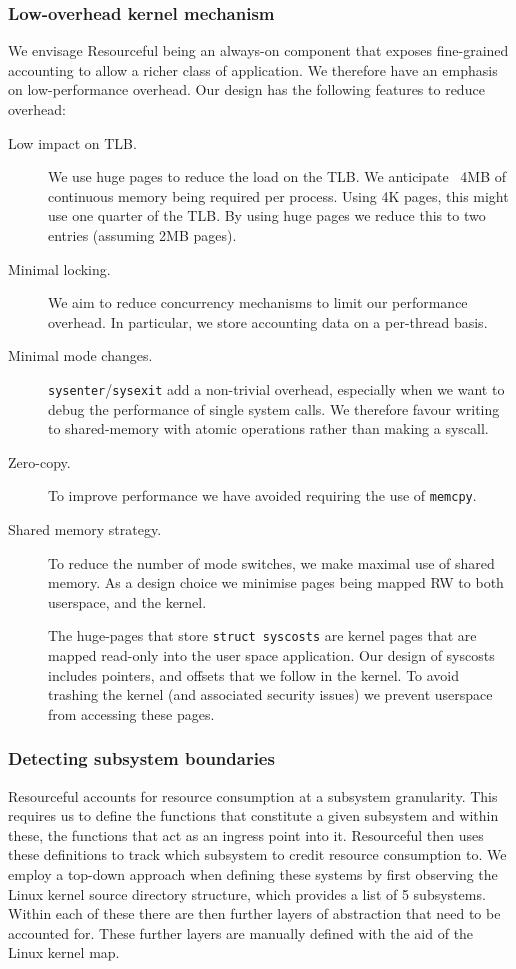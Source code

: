 \documentclass[12pt]{article}
\def\_{\textunderscore\-}
\begin{document}
  \subsubsection{Low-overhead kernel mechanism}
  We envisage Resourceful being an always-on component that exposes fine-grained accounting to allow a richer class of application. We therefore have an emphasis on low-performance overhead. Our design has the following features to reduce overhead:
  \begin{description}
  \item[Low impact on TLB.] We use huge pages to reduce the load on the TLB.
  We anticipate ~4MB of continuous memory being required per process. Using 4K pages, this might use one quarter of the TLB. By using huge pages we reduce this to two entries (assuming 2MB pages).

  \item[Minimal locking.] We aim to reduce concurrency mechanisms to limit our performance overhead. In particular, we store accounting data on a per-thread basis.

  \item[Minimal mode changes.] \texttt{sysenter}/\texttt{sysexit}  add a non-trivial overhead, especially when we want to debug the performance of single system calls. We therefore favour writing to shared-memory with atomic operations rather than making a syscall.

  \item[Zero-copy.] To improve performance we have avoided requiring the use of \texttt{memcpy}.

  \item[Shared memory strategy.] To reduce the number of mode switches, we make maximal use of shared memory. As a design choice we minimise pages being mapped RW to both userspace, and the kernel.

  The huge-pages that store \texttt{struct sys\_costs} are kernel pages that are mapped read-only into the user space application. Our design of sys\_costs includes pointers, and offsets that we follow in the kernel. To avoid trashing the kernel (and associated security issues) we prevent userspace from accessing these pages.

  \end{description}

  \subsubsection{Detecting subsystem boundaries}
  Resourceful accounts for resource consumption at a subsystem granularity.
  This requires us to define the functions that constitute a given subsystem and within these, the functions that act as an ingress point into it.
  Resourceful then uses these definitions to track which subsystem to credit resource consumption to.
  We employ a top-down approach when defining these systems by first observing the Linux kernel source directory structure, which provides a list of 5 subsystems. Within each of these there are then further layers of abstraction that need to be accounted for. These further layers are manually defined with the aid of the Linux kernel map.
\end{document}

